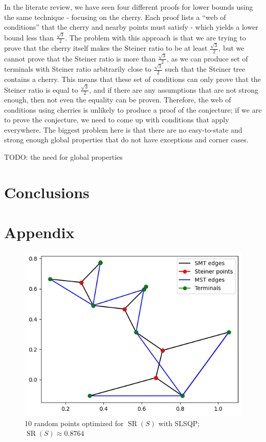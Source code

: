 \documentclass{mpaper}
\begin{document}
In the literate review, we have seen four different proofs for lower bounds using the same technique - focusing on the cherry. Each proof lists a ``web of conditions'' that the cherry and nearby points must satisfy - which yields a lower bound less than $\frac{\sqrt{3}}{2}$. The problem with this approach is that we are trying to prove that the cherry itself makes the Steiner ratio to be at least $\frac{\sqrt{3}}{2}$, but we cannot prove that the Steiner ratio is more than  $\frac{\sqrt{3}}{2}$, as we can produce set of terminals with Steiner ratio arbitrarily close to $\frac{\sqrt{3}}{2}$ such that the Steiner tree contains a cherry. This means that  these set of conditions can only prove that the Steiner ratio is equal to  $\frac{\sqrt{3}}{2}$, and if there are any assumptions that are not strong enough, then not even the equality can be proven. Therefore, the web of conditions using cherries is unlikely to produce a proof of the conjecture; if we are to prove the conjecture, we need to come up with conditions that apply everywhere. The biggest problem here is that there are no easy-to-state and strong enough global properties that do not have exceptions and corner cases.


TODO: the need for global properties

\section{Conclusions}






\section{Appendix}

\begin{figure}[h!]
  \begin{center}
  \includegraphics[scale=0.5]{plot8764.png}
  \end{center}
  \caption{\label{fig:9}10 random points optimized for $\operatorname{SR}(S)$ with SLSQP; $\operatorname{SR}(S)\approx 0.8764$}
\end{figure}
\end{document}
